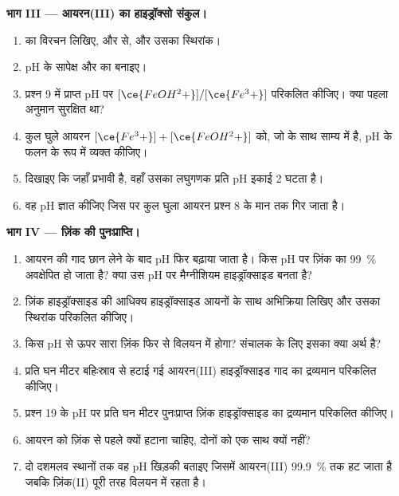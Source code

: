 \begin{problem}
\medskip
\noindent\textbf{भाग III --- आयरन(III) का हाइड्रॉक्सो संकुल।}
\begin{enumerate}[resume]
  \item {} का विरचन लिखिए,  और  से,
        और उसका स्थिरांक।
  \item pH के सापेक्ष  और  का 
        बनाइए।
  \item प्रश्न 9 में प्राप्त pH पर
        $[\ce{FeOH^2+}]/[\ce{Fe^3+}]$ परिकलित कीजिए। क्या पहला अनुमान सुरक्षित था?
  \item कुल घुले आयरन $[\ce{Fe^3+}] + [\ce{FeOH^2+}]$ को, जो
         के साथ साम्य में है, pH के फलन के रूप में व्यक्त कीजिए।
  \item दिखाइए कि जहाँ  प्रभावी है, वहाँ उसका लघुगणक
        प्रति pH इकाई 2 घटता है।
  \item वह pH ज्ञात कीजिए जिस पर कुल घुला आयरन प्रश्न 8 के
        मान तक गिर जाता है।
\end{enumerate}

\medskip
\noindent\textbf{भाग IV --- ज़िंक की पुनःप्राप्ति।}
\begin{enumerate}[resume]
  \item आयरन की गाद छान लेने के बाद pH फिर बढ़ाया जाता है। किस
        pH पर ज़िंक का \qty{99}{\percent} अवक्षेपित हो जाता है? क्या उस pH पर मैग्नीशियम
        हाइड्रॉक्साइड बनता है?
  \item ज़िंक हाइड्रॉक्साइड की आधिक्य हाइड्रॉक्साइड आयनों के साथ अभिक्रिया लिखिए
        और उसका स्थिरांक परिकलित कीजिए।
  \item किस pH से ऊपर सारा ज़िंक फिर से विलयन में होगा? संचालक के लिए
        इसका क्या अर्थ है?
  \item प्रति घन मीटर बहिःस्राव से हटाई गई आयरन(III) हाइड्रॉक्साइड गाद का
        द्रव्यमान परिकलित कीजिए।
  \item प्रश्न 19 के pH पर प्रति घन मीटर पुनःप्राप्त ज़िंक हाइड्रॉक्साइड का
        द्रव्यमान परिकलित कीजिए।
  \item आयरन को ज़िंक से पहले क्यों हटाना चाहिए, दोनों को
        एक साथ क्यों नहीं?
  \item दो दशमलव स्थानों तक वह pH खिड़की बताइए जिसमें आयरन(III)
        \qty{99.9}{\percent} तक हट जाता है जबकि ज़िंक(II) पूरी तरह
        विलयन में रहता है।
\end{enumerate}
\end{problem}

